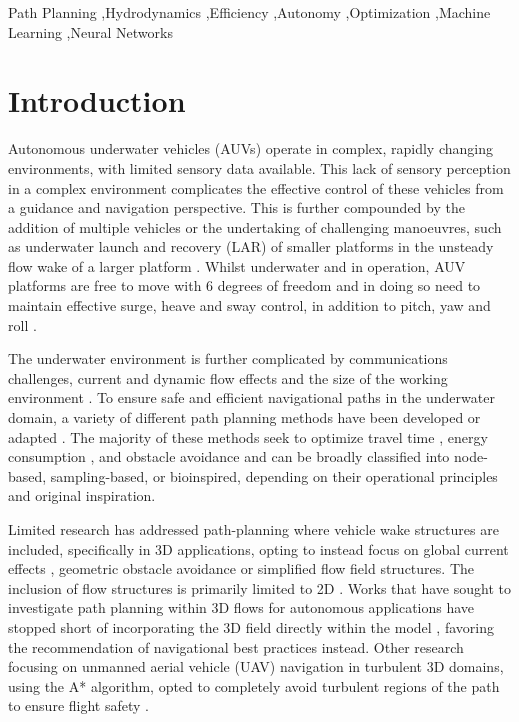 \documentclass[final,5p,times,twocolumn]{elsarticle}
\begin{document}
\begin{frontmatter}
\begin{keyword}
Path Planning \sep Hydrodynamics \sep Efficiency \sep Autonomy \sep Optimization \sep Machine Learning \sep Neural Networks
\end{keyword}

\end{frontmatter}



\section{Introduction} %
\label{Introduction } %
Autonomous underwater vehicles (AUVs) operate in complex, rapidly changing environments, with limited sensory data available. This lack of sensory perception in a complex environment complicates the effective control of these vehicles from a guidance and navigation perspective. This is further compounded by the addition of multiple vehicles or the undertaking of challenging manoeuvres, such as underwater launch and recovery (LAR) of smaller platforms in the unsteady flow wake of a larger platform \cite{IEEE, SUBSTEC}. Whilst underwater and in operation, AUV platforms are free to move with 6 degrees of freedom and in doing so need to maintain effective surge, heave and sway control, in addition to pitch, yaw and roll \cite{X1}. 

The underwater environment is further complicated by communications challenges, current and dynamic flow effects and the size of the working environment \cite{X1}. To ensure safe and efficient navigational paths in the underwater domain, a variety of different path planning methods have been developed or adapted \cite{X2}. The majority of these methods seek to optimize travel time \cite{X3}, energy consumption \cite{X4}, and obstacle avoidance \cite{X5} and can be broadly classified into node-based, sampling-based, or bioinspired, depending on their operational principles and original inspiration. 

Limited research has addressed path-planning where vehicle wake structures are included, specifically in 3D applications, opting to instead focus on global current effects \cite{X6}, geometric obstacle avoidance or simplified \cite{X7} flow field structures. The inclusion of flow structures is primarily limited to 2D \cite{X6, X7}. Works that have sought to investigate path planning within 3D flows for autonomous applications have stopped short of incorporating the 3D field directly within the model \cite{X8}, favoring the recommendation of navigational best practices instead. Other research focusing on unmanned aerial vehicle (UAV) navigation in turbulent 3D domains, using the A* algorithm, opted to completely avoid turbulent regions of the path to ensure flight safety \cite{X9}.
\end{document}
